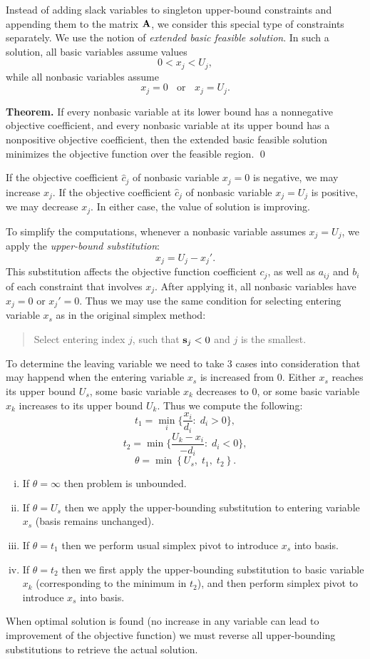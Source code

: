 \documentclass[10pt]{article}
\begin{document}
Instead of adding slack variables to singleton upper-bound constraints and appending them to the matrix ${\bf A}$, we consider this special type of constraints separately. We use the notion of {\it extended basic feasible solution}. In such a solution, all basic variables assume values 
$$0 < x_j < U_j,$$ 
while all nonbasic variables assume
$$ x_j = 0 \;\; \textrm{ or } \;\; x_j = U_j.$$

\medskip

{\bf Theorem.} If every nonbasic variable at its lower bound has a nonnegative objective coefficient, and every nonbasic variable at its upper bound has a nonpositive objective coefficient, then the extended basic feasible solution minimizes the objective function over the feasible region. \qed

\medskip

If the objective coefficient $\hat{c}_j$ of nonbasic variable $x_j = 0$ is negative, we may increase $x_j$. If the objective coefficient $\hat{c}_j$ of nonbasic variable $x_j = U_j$ is positive, we may decrease $x_j$. In either case, the value of solution is improving.

To simplify the computations, whenever a nonbasic variable assumes $x_j=U_j$, we apply the {\it upper-bound substitution}:
$$
    x_j = U_j - x_j'.
$$
This substitution affects the objective function coefficient $c_j$, as well as $a_{ij}$ and $b_i$ of each constraint that involves $x_j$. After applying it, all nonbasic variables have $x_j = 0$ or $x_j' = 0$. Thus we may use the same condition for selecting entering variable $x_s$ as in the original simplex method:

\begin{quote}
Select entering index $j$, such that ${\bf s}_j < 0$ and $j$ is the smallest.
\end{quote}

To determine the leaving variable we need to take 3 cases into consideration that may happend when the entering variable $x_s$ is increased from 0. Either $x_s$ reaches its upper bound $U_s$, some basic variable $x_k$ decreases to 0, or some basic variable $x_k$ increases to its upper bound $U_k$. Thus we compute the following:
$$
    t_1 = \min_i \{ \frac{x_i}{d_i} : \; d_i > 0 \},
$$
$$
    t_2 = \min \{ \frac{U_k - x_i}{-d_i} : \; d_i < 0 \},
$$
$$
    \theta = \min \left\{ U_s, \; t_1, \; t_2 \right\}.
$$

\begin{enumerate}[i)]
    \item If $\theta = \infty$ then problem is unbounded.
    \item If $\theta = U_s$ then we apply the upper-bounding substitution to entering variable $x_s$ (basis remains unchanged).
    \item If $\theta = t_1$ then we perform usual simplex pivot to introduce $x_s$ into basis.
    \item If $\theta = t_2$ then we first apply the upper-bounding substitution to basic variable $x_k$ (corresponding to the minimum in $t_2$), and then perform simplex pivot to introduce $x_s$ into basis.
\end{enumerate}

When optimal solution is found (no increase in any variable can lead to improvement of the objective function) we must reverse all upper-bounding substitutions to retrieve the actual solution.
\end{document}

